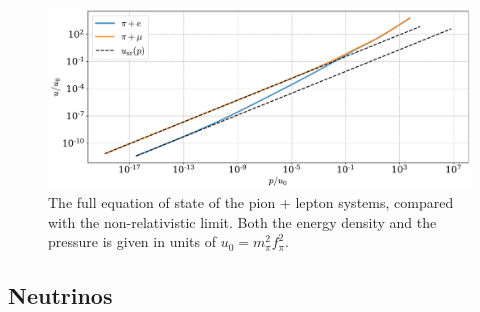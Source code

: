 \begin{figure}[!htb]
    \centering
    \includegraphics[width=\textwidth]{../scripts/figurer/charge_neutrality/eos_lim.pdf}
    \caption{
        The full equation of state of the pion + lepton systems, compared with the non-relativistic limit.
        Both the energy density and the pressure is given in units of $u_0 = m_\pi^2 f_\pi^2$.
    }
    \label{fig: lepton eos limit}
\end{figure}



\subsection{Neutrinos}
\label{subsection: neutrinos}

